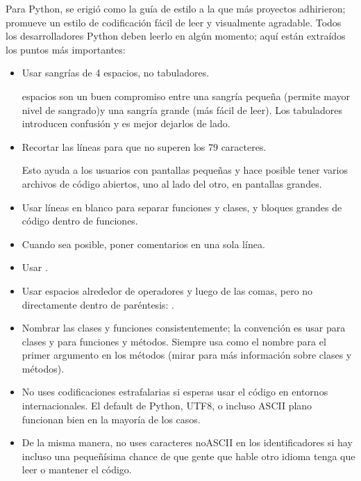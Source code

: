 \documentclass[a4,10pt,spanish]{sphinxmanual}
\begin{document}
\sphinxAtStartPar
Para Python,   se erigió como la guía de estilo a la que más proyectos adhirieron; promueve un estilo de codificación fácil de leer y visualmente agradable. Todos los desarrolladores Python deben leerlo en algún momento; aquí están extraídos los puntos más importantes:
\begin{itemize}
\item {} 
\sphinxAtStartPar
Usar sangrías de 4 espacios, no tabuladores.

 espacios son un buen compromiso entre una sangría pequeña (permite mayor nivel de sangrado)y una sangría grande (más fácil de leer). Los tabuladores introducen confusión y es mejor dejarlos de lado.

\item {} 
\sphinxAtStartPar
Recortar las líneas para que no superen los 79 caracteres.

\sphinxAtStartPar
Esto ayuda a los usuarios con pantallas pequeñas y hace posible tener varios archivos de código abiertos, uno al lado del otro, en pantallas grandes.

\item {} 
\sphinxAtStartPar
Usar líneas en blanco para separar funciones y clases, y bloques grandes de código dentro de funciones.

\item {} 
\sphinxAtStartPar
Cuando sea posible, poner comentarios en una sola línea.

\item {} 
\sphinxAtStartPar
Usar .

\item {} 
\sphinxAtStartPar
Usar espacios alrededor de operadores y luego de las comas, pero no directamente dentro de paréntesis: .

\item {} 
\sphinxAtStartPar
Nombrar las clases y funciones consistentemente; la convención es usar  para clases y  para funciones y métodos. Siempre usa  como el nombre para el primer argumento en los métodos (mirar {\hyperref[\detokenize{tutorial/classes:tut-firstclasses}]{}} para más información sobre clases y métodos).

\item {} 
\sphinxAtStartPar
No uses codificaciones estrafalarias si esperas usar el código en entornos internacionales. El default de Python, UTF\sphinxhyphen{}8, o incluso ASCII plano funcionan bien en la mayoría de los casos.

\item {} 
\sphinxAtStartPar
De la misma manera, no uses caracteres no\sphinxhyphen{}ASCII en los identificadores si hay incluso una pequeñísima chance de que gente que hable otro idioma tenga que leer o mantener el código.

\end{itemize}
\end{document}
